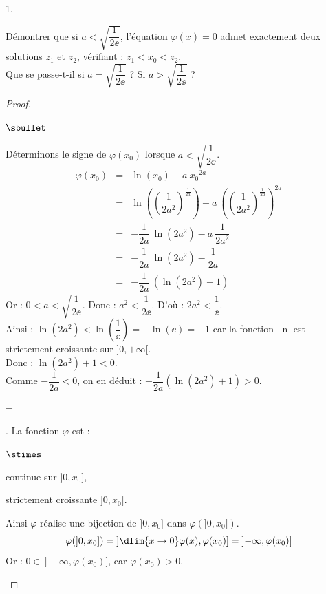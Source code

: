 \documentclass[11pt]{article}%
\begin{document}
\begin{noliste}{1.}
\item Démontrer que si $a<\sqrt{\dfrac{1}{2\ee}}$, l'équation
  $\varphi(x)=0$ admet exactement deux solutions $z_1$ et $z_2$,
  vérifiant : $z_1<x_0<z_2$.\\
  Que se passe-t-il si $a=\sqrt{\dfrac{1}{2\ee}}$ ? Si
  $a>\sqrt{\dfrac{1}{2\ee}}$ ?

  \begin{proof}~
    \begin{noliste}{$\sbullet$}
    \item Déterminons le signe de $\varphi(x_0)$ lorsque 
      $a<\sqrt{\dfrac{1}{2\ee}}$.
      \[
      \begin{array}{rcl}
        \varphi(x_0) & = & \ln(x_0) - a \ x_0{}^{2a}
        \\[.2cm]
        & = &  
        \ln\left(\left(\dfrac{1}{2a^2}\right)^{\frac{1}{2a}}\right)
        - a \ \left(\left(\dfrac{1}{2a^2}\right)^{\frac{1}{2a}}
        \right)^{2a} 
        \\[.6cm]
        & = & -\dfrac{1}{2a} \ \ln(2a^2) - a \ \dfrac{1}{2a^2}
        \\[0.4cm]
        & = &  -\dfrac{1}{2a} \ \ln(2a^2) - \dfrac{1}{2a}
        \\[0.4cm]
        & = &  -\dfrac{1}{2a} \ (\ln(2a^2)+1)
      \end{array}
      \]
      Or : $0<a<\sqrt{\dfrac{1}{2\ee}}$. Donc : $a^2<\dfrac{1}{2\ee}$.
      D'où : $2a^2 <\dfrac{1}{\ee}$.\\[.1cm]
      Ainsi : $\ln(2a^2)<\ln\left(\dfrac{1}{\ee}\right)=-\ln(\ee)=-1$ car la 
      fonction $\ln$ est strictement croissante sur $]0,+\infty[$.\\[.1cm]
      Donc : $\ln(2a^2)+1<0$. \\[.1cm]
      Comme $-\dfrac{1}{2a}<0$, on en déduit : 
      $-\dfrac{1}{2a}(\ln(2a^2)+1)>0$. %
      

      \newpage
      
      
      \begin{noliste}{$-$}
      \item \dashuline{Étude sur $]0,x_0]$}. La fonction $\varphi$ est
        :
	\begin{noliste}{$\stimes$}
	\item continue sur $]0,x_0]$,
	\item strictement croissante $]0,x_0]$.
	\end{noliste}
        Ainsi $\varphi$ réalise une bijection de $]0,x_0]$ dans
        $\varphi(]0,x_0])$.
        \[
        \varphi(]0,x_0])= \left] \dlim{x \to 0}
          \varphi(x),\varphi(x_0)\right]= \left]-\infty,
          \varphi(x_0)\right]
        \]
        Or : $0\in \ ]-\infty, \varphi(x_0)]$, car $\varphi(x_0)>0$.%
        \conc{Donc l'équation $\varphi(x)=0$ admet exactement une
          solution sur $]0,x_0]$ \\ que l'on notera $z_1$.}
        

\end{noliste}
\end{noliste}
\end{proof}
\end{noliste}
\end{document}
